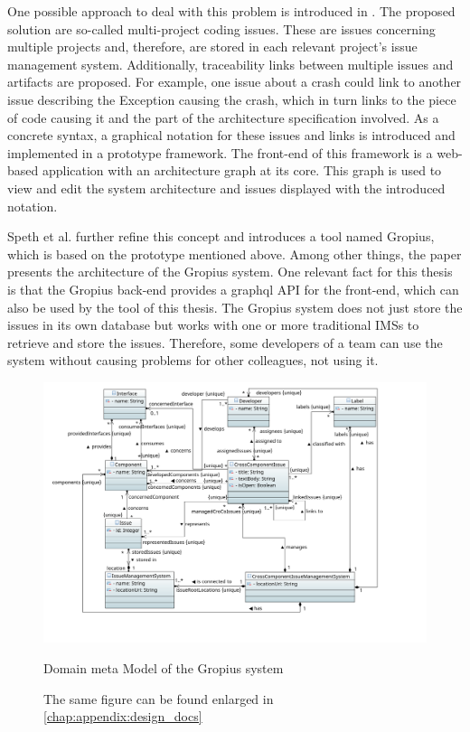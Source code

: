 One possible approach to deal with this problem is introduced in \cite{Speth2019}.
The proposed solution are so-called multi-project coding issues. These are issues concerning multiple projects and, therefore, are stored in each relevant project's issue management system. 
Additionally, traceability links between multiple issues and artifacts are proposed. 
For example, one issue about a crash could link to another issue describing the Exception causing the crash, which in turn links to the piece of code causing it and the part of the architecture specification involved.
As a concrete syntax, a graphical notation for these issues and links is introduced and implemented in a prototype framework. The front-end of this framework is a web-based application with an architecture graph at its core.
This graph is used to view and edit the system architecture and issues displayed with the introduced notation. 

Speth et al. \cite{speth2020gropius} further refine this concept and introduces a tool named \gls{Gropius}, which is based on the prototype mentioned above.
Among other things, the paper presents the architecture of the \gls{Gropius} system. 
One relevant fact for this thesis is that the \gls{Gropius} back-end provides a \gls{graphql} \gls{API} for the front-end,
which can also be used by the tool of this thesis.
The \gls{Gropius} system does not just store the issues in its own database but works with one or more traditional \glspl{IMS} to retrieve and store the issues.
Therefore, some developers of a team can use the system without causing problems for other colleagues, not using it.

\begin{figure}[!h]
	\centering
	\includegraphics[width=\textwidth]{graphics/domainMetaModel.png}
	\caption{Domain meta Model of the \gls{Gropius} system}
	\caption*{\footnotesize{The same figure can be found enlarged in \cref{chap:appendix:design_docs}}}
	\label{fig:c2:domain_meta_model}
\end{figure}

